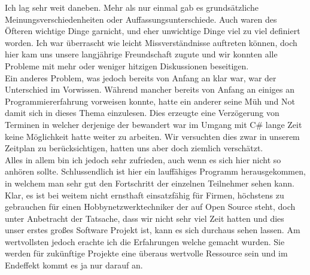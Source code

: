 \documentclass[12pt,a4paper]{report}
\begin{document}
Ich lag sehr weit daneben. Mehr als nur einmal gab es grundsätzliche Meinungsverschiedenheiten oder Auffassungsunterschiede. Auch waren des Öfteren wichtige Dinge garnicht, und eher unwichtige Dinge viel zu viel definiert worden. Ich war überrascht wie leicht Missverständnisse auftreten können, doch hier kam uns unsere langjährige Freundschaft zugute und wir konnten alle Probleme mit mehr oder weniger hitzigen Diskussionen beseitigen.\\

Ein anderes Problem, was jedoch bereits von Anfang an klar war, war der Unterschied im Vorwissen. Während mancher bereits von Anfang an einiges an Programmiererfahrung vorweisen konnte, hatte ein anderer seine Müh und Not damit sich in dieses Thema einzulesen. Dies erzeugte eine Verzögerung von Terminen in welcher derjenige der bewandert war im Umgang mit C\# lange Zeit keine Möglichkeit hatte weiter zu arbeiten. Wir versuchten dies zwar in unserem Zeitplan zu berücksichtigen, hatten uns aber doch ziemlich verschätzt.\\

Alles in allem bin ich jedoch sehr zufrieden, auch wenn es sich hier nicht so anhören sollte. Schlussendlich ist hier ein lauffähiges Programm herausgekommen, in welchem man sehr gut den Fortschritt der einzelnen Teilnehmer sehen kann. Klar, es ist bei weitem nicht ernsthaft einsatzfähig für Firmen, höchstens zu gebrauchen für einen Hobbynetzwerktechniker der auf Open Source steht, doch unter Anbetracht der Tatsache, dass wir nicht sehr viel Zeit hatten und dies unser erstes großes Software Projekt ist, kann es sich durchaus sehen lassen. Am wertvollsten jedoch erachte ich die Erfahrungen welche gemacht wurden. Sie werden für zukünftige Projekte eine überaus wertvolle Ressource sein und im Endeffekt kommt es ja nur darauf an.
\end{document}
